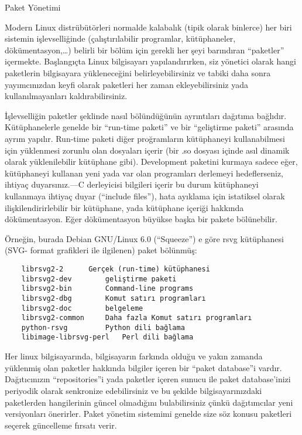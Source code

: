 \begin{section}{Paket Yönetimi}

Modern Linux distrübütörleri normalde kalabalık (tipik olarak binlerce) her biri sistemin işlevselliğinde (çalıştırılabilir programlar, kütüphaneler, dökümentasyon,…) belirli bir bölüm için gerekli her şeyi barındıran “paketler” içermekte. Başlangıçta Linux bilgisayarı yapılandırırken, siz yönetici olarak hangi paketlerin bilgisayara yükleneceğini belirleyebilirsiniz ve tabiki daha sonra yayımcınızdan keyfi olarak paketleri her zaman ekleyebilirsiniz yada kullanılmayanları kaldırabilirsiniz.

İşlevselliğin paketler şeklinde nasıl bölündüğünün ayrıntıları dağıtıma bağlıdır. Kütüphanelerle genelde bir “run-time paketi” ve bir “geliştirme paketi” arasında ayrım yapılır. Run-time paketi diğer proğramların kütüphaneyi kullanabilmesi için yüklenmesi zorunlu olan dosyaları içerir (bir .so dosyası içinde asıl dinamik olarak yüklenilebilir kütüphane gibi). Development paketini kurmaya sadece eğer, kütüphaneyi kullanan yeni yada var olan programları derlemeyi hedeflerseniz, ihtiyaç duyarsınız.—C derleyicisi bilgileri içerir bu durum kütüphaneyi kullanmaya ihtiyaç duyar (“include files”), hata ayıklama için istatiksel olarak ilişkilendirirlebilir bir kütüphane, yada kütüphane içeriği hakkında dökümentasyon. Eğer dökümentasyon büyükse başka bir pakete bölünebilir.

Örneğin, burada Debian GNU/Linux 6.0 (“Squeeze”) e göre rsvg kütüphanesi (SVG- format grafikleri ile ilgilenen) paket bölünmüş: 
\begin{verbatim}
	librsvg2-2 		Gerçek (run-time) kütüphanesi
	librsvg2-dev 		geliştirme paketi
	librsvg2-bin 		Command-line programs
	librsvg2-dbg 		Komut satırı programları
	librsvg2-doc 		belgeleme
	librsvg2-common 	Daha fazla Komut satırı programları
	python-rsvg 		Python dili bağlama
	libimage-librsvg-perl 	Perl dili bağlama
\end{verbatim}

Her linux bilgisayarında, bilgisayarın farkında olduğu ve yakın zamanda yüklenmiş olan paketler hakkında bilgiler içeren bir “paket database”i vardır. Dağıtıcınızın “repositories”i yada paketler içeren sunucu ile paket database’inizi periyodik olarak senkronize edebilirsiniz ve bu şekilde bilgisayarınızdaki paketlerden hangilerinin güncel olmadığını bulabilirsiniz çünkü dağıtımcılar yeni versiyonları önerirler. Paket yönetim sistemimi genelde size söz konusu paketleri seçerek güncelleme fırsatı verir.


\end{section}
